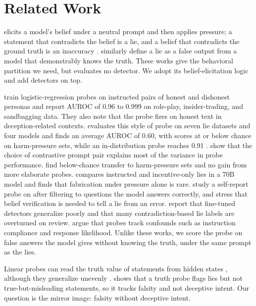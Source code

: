 \section{Related Work}
\label{sec:related}

\mask elicits a model's belief under a neutral prompt and then applies pressure; a statement that contradicts the belief is a lie, and a belief that contradicts the ground truth is an inaccuracy \citep{ren2025mask}.
\citet{pacchiardi2023catch} similarly define a lie as a false output from a model that demonstrably knows the truth.
These works give the behavioral partition we need, but \mask evaluates no detector.
We adopt its belief-elicitation logic and add detectors on top.

\citet{goldowskydill2025detecting} train logistic-regression probes on instructed pairs of honest and dishonest personas and report AUROC of 0.96 to 0.999 on role-play, insider-trading, and sandbagging data.
They also note that the probe fires on honest text in deception-related contexts.
\liarsbench evaluates this style of probe on seven lie datasets and four models and finds an average AUROC of 0.60, with scores at or below chance on harm-pressure sets, while an in-distribution probe reaches 0.91 \citep{kretschmar2025liars}.
\citet{natarajan2026one} show that the choice of contrastive prompt pair explains most of the variance in probe performance.
\citet{moustafa2026beyond} find below-chance transfer to harm-pressure sets and no gain from more elaborate probes.
\citet{luikham2026asymmetries} compares instructed and incentive-only lies in a 70B model and finds that fabrication under pressure alone is rare.
\citet{cooney2026did} study a self-report probe on \triviaqa after filtering to questions the model answers correctly, and stress that belief verification is needed to tell a lie from an error.
\citet{hopkins2026finetuned} report that fine-tuned detectors generalize poorly and that many contradiction-based lie labels are overturned on review.
\citet{vonklinski2026stress} argue that probes track confounds such as instruction compliance and response likelihood.
Unlike these works, we score the probe on false answers the model gives without knowing the truth, under the same prompt as the lies.

Linear probes can read the truth value of statements from hidden states \citep{burns2022discovering,azaria2023internal,marks2023geometry,burger2024truth}, although they generalize unevenly \citep{levinstein2023still}.
\citet{thormann2026probing} shows that a truth probe flags lies but not true-but-misleading statements, so it tracks falsity and not deceptive intent.
Our question is the mirror image: falsity without deceptive intent.

